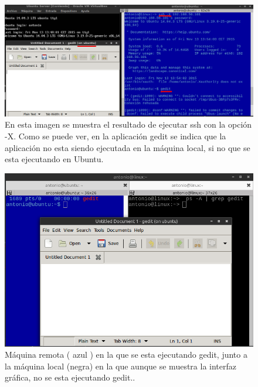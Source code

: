 \begin{figure}[H]
    \begin{center}
    \advance\leftskip-2.5cm
        \includegraphics[scale=0.5]{imagenes/img1}
        \caption{En esta imagen se muestra el resultado de ejecutar ssh con la opción -X. Como se puede ver, en la aplicación gedit se indica que la aplicación no esta siendo ejecutada en la máquina local, si no que se esta ejecutando en Ubuntu.}
        \label{fig1}
    \end{center}
\end{figure}


\begin{figure}[H]
    \begin{center}
    \advance\leftskip-2.5cm
        \includegraphics[scale=0.5]{imagenes/img60}
        \caption{Máquina remota ( azul ) en la que se esta ejecutando gedit, junto a la máquina local (negra) en la que aunque se muestra la interfaz gráfica, no se esta ejecutando gedit..}
        \label{fig57}
    \end{center}
\end{figure}



